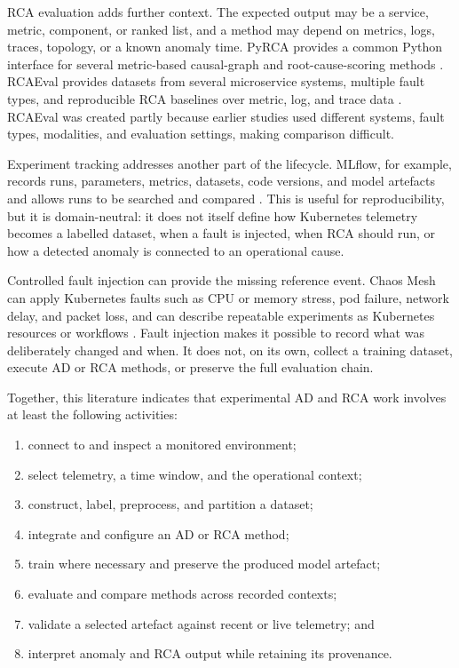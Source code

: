 RCA evaluation adds further context. The expected output may be a service, metric, component, or ranked list, and a method may depend on metrics, logs, traces, topology, or a known anomaly time. PyRCA provides a common Python interface for several metric-based causal-graph and root-cause-scoring methods \parencite{liu2023pyrca}. RCAEval provides datasets from several microservice systems, multiple fault types, and reproducible RCA baselines over metric, log, and trace data \parencite{pham2025rcaeval}. RCAEval was created partly because earlier studies used different systems, fault types, modalities, and evaluation settings, making comparison difficult.

Experiment tracking addresses another part of the lifecycle. MLflow, for example, records runs, parameters, metrics, datasets, code versions, and model artefacts and allows runs to be searched and compared \parencite{mlflowTracking}. This is useful for reproducibility, but it is domain-neutral: it does not itself define how Kubernetes telemetry becomes a labelled dataset, when a fault is injected, when RCA should run, or how a detected anomaly is connected to an operational cause.

Controlled fault injection can provide the missing reference event. Chaos Mesh can apply Kubernetes faults such as CPU or memory stress, pod failure, network delay, and packet loss, and can describe repeatable experiments as Kubernetes resources or workflows \parencite{chaosMeshDocs}. Fault injection makes it possible to record what was deliberately changed and when. It does not, on its own, collect a training dataset, execute AD or RCA methods, or preserve the full evaluation chain.

Together, this literature indicates that experimental AD and RCA work involves at least the following activities:

\begin{enumerate}
    \item connect to and inspect a monitored environment;
    \item select telemetry, a time window, and the operational context;
    \item construct, label, preprocess, and partition a dataset;
    \item integrate and configure an AD or RCA method;
    \item train where necessary and preserve the produced model artefact;
    \item evaluate and compare methods across recorded contexts;
    \item validate a selected artefact against recent or live telemetry; and
    \item interpret anomaly and RCA output while retaining its provenance.
\end{enumerate}

